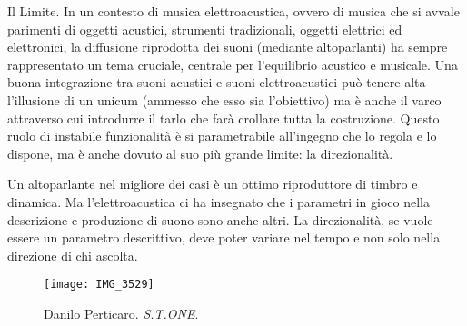 Il Limite. In un contesto di musica elettroacustica, ovvero di musica che si avvale parimenti
di oggetti acustici, strumenti tradizionali, oggetti elettrici ed elettronici, la diffusione
riprodotta dei suoni (mediante altoparlanti) ha sempre rappresentato un tema cruciale,
centrale per l'equilibrio acustico e musicale. Una buona integrazione tra suoni acustici
e suoni elettroacustici può tenere alta l'illusione di un unicum (ammesso che esso sia l'obiettivo)
ma è anche il varco attraverso cui introdurre il tarlo che farà crollare tutta la costruzione.
Questo ruolo di instabile funzionalità è si parametrabile all'ingegno che lo regola e lo dispone,
ma è anche dovuto al suo più grande limite: la direzionalità.

Un altoparlante nel migliore dei casi è un ottimo riproduttore di timbro e dinamica.
Ma l'elettroacustica ci ha insegnato che i parametri in gioco nella descrizione e
produzione di suono sono anche altri. La direzionalità, se vuole essere un parametro descrittivo,
deve poter variare nel tempo e non solo nella direzione di chi ascolta.

\vfill

\begin{figure}[h]
\centering
{\texttt{[image: IMG\_3529]}}
\caption[Danilo Perticaro. \emph{S.T.ONE}.]{Danilo Perticaro. \emph{S.T.ONE}.}
\label{fig:dpstone}
\end{figure}
